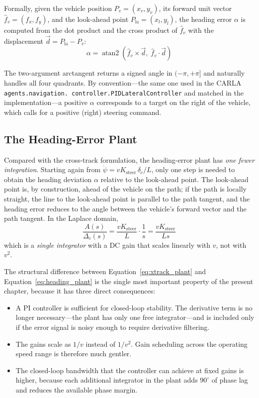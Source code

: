 Formally, given the vehicle position $P_v = (x_v, y_v)$, its forward unit vector $\hat{f}_v = (f_x, f_y)$, and the look-ahead point $P_{\mathrm{la}} = (x_l, y_l)$, the heading error $\alpha$ is computed from the dot product and the cross product of $\hat{f}_v$ with the displacement $\vec{d} = P_{\mathrm{la}} - P_v$:
\begin{equation}
    \alpha = \operatorname{atan2}\!\left(\hat{f}_v \times \vec{d},\; \hat{f}_v \cdot \vec{d}\right)
\end{equation}

The two-argument arctangent returns a signed angle in $(-\pi, +\pi]$ and naturally handles all four quadrants. By convention---the same one used in the CARLA \texttt{agents.navigation. controller.PIDLateralController} and matched in the implementation---a positive $\alpha$ corresponds to a target on the right of the vehicle, which calls for a positive (right) steering command.

\subsection{The Heading-Error Plant}
Compared with the cross-track formulation, the heading-error plant has \emph{one fewer integration}. Starting again from $\dot{\psi} = v K_{\mathrm{steer}}\,\delta_c / L$, only one step is needed to obtain the heading deviation $\alpha$ relative to the look-ahead point. The look-ahead point is, by construction, ahead of the vehicle on the path; if the path is locally straight, the line to the look-ahead point is parallel to the path tangent, and the heading error reduces to the angle between the vehicle's forward vector and the path tangent. In the Laplace domain,
\begin{equation}
    \frac{A(s)}{\Delta_c(s)} = \frac{v K_{\mathrm{steer}}}{L} \cdot \frac{1}{s} = \frac{v K_{\mathrm{steer}}}{L s}
    \label{eq:heading_plant}
\end{equation}
which is a \emph{single integrator} with a DC gain that scales linearly with $v$, not with $v^2$.

The structural difference between Equation~\eqref{eq:xtrack_plant} and Equation~\eqref{eq:heading_plant} is the single most important property of the present chapter, because it has three direct consequences:

\begin{itemize}
    \item A PI controller is sufficient for closed-loop stability. The derivative term is no longer necessary---the plant has only one free integrator---and is included only if the error signal is noisy enough to require derivative filtering.
    \item The gains scale as $1/v$ instead of $1/v^2$. Gain scheduling across the operating speed range is therefore much gentler.
    \item The closed-loop bandwidth that the controller can achieve at fixed gains is higher, because each additional integrator in the plant adds $90^\circ$ of phase lag and reduces the available phase margin.
\end{itemize}

